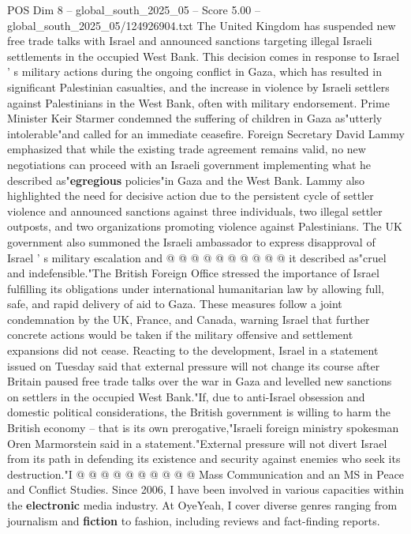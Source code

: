 \begin{textsample}{POS Dim 8 – global\_south\_2025\_05 – Score 5.00 – global\_south\_2025\_05/124926904.txt}  \label{ex:f8_pos_135}
The United Kingdom has suspended new free trade talks with Israel and announced sanctions targeting illegal Israeli settlements in the occupied West Bank.
This decision comes in response to Israel ' s military actions during the ongoing conflict in Gaza, which has resulted in significant Palestinian casualties, and the increase in violence by Israeli settlers against Palestinians in the West Bank, often with military endorsement.
Prime Minister Keir Starmer condemned the suffering of children in Gaza as"utterly intolerable"and called for an immediate ceasefire.
Foreign Secretary David Lammy emphasized that while the existing trade agreement remains valid, no new negotiations can proceed with an Israeli government implementing what he described as"\textbf{egregious} policies"in Gaza and the West Bank.
Lammy also highlighted the need for decisive action due to the persistent cycle of settler violence and announced sanctions against three individuals, two illegal settler outposts, and two organizations promoting violence against Palestinians.
The UK government also summoned the Israeli ambassador to express disapproval of Israel ' s military escalation and @ @ @ @ @ @ @ @ @ @ it described as"cruel and indefensible."The British Foreign Office stressed the importance of Israel fulfilling its obligations under international humanitarian law by allowing full, safe, and rapid delivery of aid to Gaza.
These measures follow a joint condemnation by the UK, France, and Canada, warning Israel that further concrete actions would be taken if the military offensive and settlement expansions did not cease.
Reacting to the development, Israel in a statement issued on Tuesday said that external pressure will not change its course after Britain paused free trade talks over the war in Gaza and levelled new sanctions on settlers in the occupied West Bank."If, due to anti-Israel obsession and domestic political considerations, the British government is willing to harm the British economy -- that is its own prerogative,"Israeli foreign ministry spokesman Oren Marmorstein said in a statement."External pressure will not divert Israel from its path in defending its existence and security against enemies who seek its destruction."I @ @ @ @ @ @ @ @ @ @ Mass Communication and an MS in Peace and Conflict Studies.
Since 2006, I have been involved in various capacities within the \textbf{electronic} media industry.
At OyeYeah, I cover diverse genres ranging from journalism and \textbf{fiction} to fashion, including reviews and fact-finding reports.

\end{textsample}
